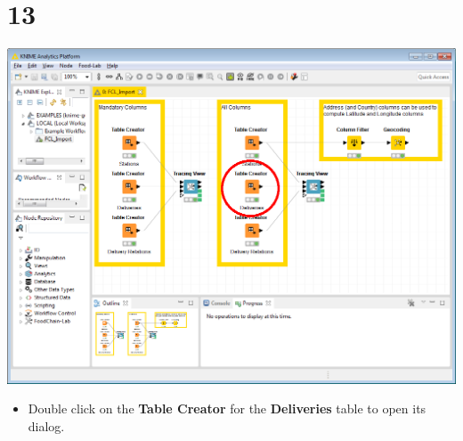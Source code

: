 \documentclass[10pt]{beamer}
\begin{document}
\section{13}
\begin{frame}
	\begin{center}
  		\includegraphics[height=0.6\textheight]{13.png}
	\end{center}
	\begin{itemize}
		\item Double click on the \textbf{Table Creator} for the \textbf{Deliveries} table to open its dialog.
	\end{itemize}
\end{frame}
\end{document}
